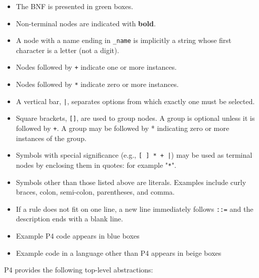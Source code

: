\documentclass[12pt]{article}
\begin{document}
\begin{itemize}
\item
The BNF is presented in green boxes.
\item
Non-terminal nodes are indicated with \textbf{bold}.
\item
A node with a name ending in \texttt{_name} is implicitly a string whose first character 
is a letter (not a digit).
\item
Nodes followed by \texttt{+} indicate one or more instances.
\item
Nodes followed by \texttt{*} indicate zero or more instances.
\item
A vertical bar, \texttt{|}, separates options from which exactly one must be selected.
\item
Square brackets, \texttt{[]}, are used to group nodes. A group is optional unless 
it is followed by \texttt{+}. A group may be followed by * indicating zero or more 
instances of the group.
\item
Symbols with special significance (e.g., \texttt{[ ] * + |}) may be used as terminal 
nodes by enclosing them in quotes: for example "\texttt{*}".
\item
Symbols other than those listed above are literals. Examples include curly 
braces, colon, semi-colon, parentheses, and comma.
\item
If a rule does not fit on one line, a new line immediately follows \texttt{::=} and 
the description ends with a blank line.
\item
Example P4 code appears in blue boxes
\item
Example code in a language other than P4 appears in beige boxes
\end{itemize}



P4 provides the following top-level abstractions: 
\end{document}
